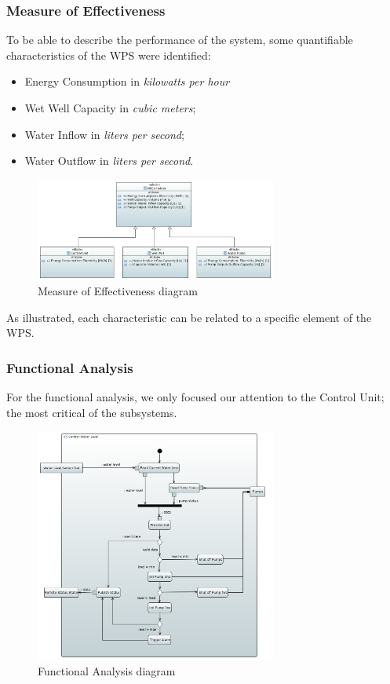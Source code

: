 \documentclass[11pt]{article}
\begin{document}
\subsubsection{Measure of Effectiveness}

To be able to describe the performance of the system, some quantifiable characteristics of the WPS were identified:

\begin{itemize}
\setlength\itemsep{0em}
  \item Energy Consumption in \textit{kilowatts per hour}
  \item Wet Well Capacity in \textit{cubic meters};
  \item Water Inflow in \textit{liters per second};
  \item Water Outflow in \textit{liters per second}.
\end{itemize}

\begin{figure}[H]
  \centering
  \includegraphics[width=300px]{../diagrams/measure-of-effectiveness.png}
  \caption{Measure of Effectiveness diagram}
  \label{fig:MoE}
\end{figure}

As illustrated, each characteristic can be related to a specific element of the WPS.

\subsubsection{Functional Analysis}

For the functional analysis, we only focused our attention to the Control Unit; the most critical of the subsystems.

\begin{figure}[H]
  \centering
  \includegraphics[width=300px]{../diagrams/functional-analysis-wps.png}
  \caption{Functional Analysis diagram}
  \label{fig:Functional Analysis}
\end{figure}
\end{document}
